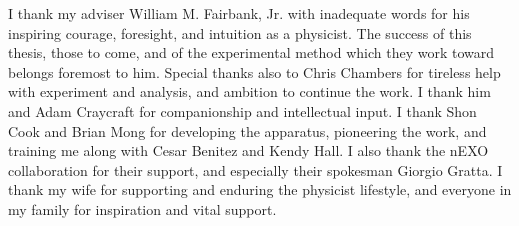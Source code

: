 \begin{acknowledgements}
I thank my adviser William M. Fairbank, Jr. with inadequate words for his inspiring courage, foresight, and intuition as a physicist.  The success of this thesis, those to come, and of the experimental method which they work toward belongs foremost to him.  Special thanks also to Chris Chambers for tireless help with experiment and analysis, and ambition to continue the work.  I thank him and Adam Craycraft for companionship and intellectual input.  I thank Shon Cook and Brian Mong for developing the apparatus, pioneering the work, and training me along with Cesar Benitez and Kendy Hall.  I also thank the nEXO collaboration for their support, and especially their spokesman Giorgio Gratta.  I thank my wife for supporting and enduring the physicist lifestyle, and everyone in my family for inspiration and vital support.

\end{acknowledgements}